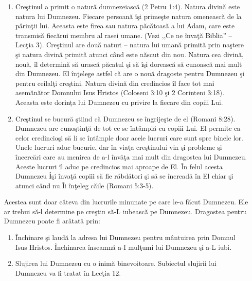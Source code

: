 \begin{enumerate}
\item Creştinul a primit o natură dumnezeiască (2 Petru 1:4). Natura divină este natura lui Dumnezeu. Fiecare persoană îşi primeşte natura omenească de la părinţii lui. Aceasta este firea sau natura păcătoasă a lui Adam, care este transmisă fiecărui membru al rasei umane. (Vezi ,,Ce ne învaţă Biblia'' – Lecţia 3). Creştinul are două naturi – natura lui umană primită prin naştere şi natura divină primită atunci când este născut din nou. Natura cea divină, nouă, îl determină să urască păcatul şi să îşi dorească să cunoască mai mult din Dumnezeu. El înţelege astfel că are o nouă dragoste pentru Dumnezeu şi pentru ceilalţi creştini. Natura divină din credincios îl face tot mai asemănător Domnului Isus Hristos (Coloseni 3:10 şi 2 Corinteni 3:18). Aceasta este dorința lui Dumnezeu cu privire la fiecare din copiii Lui.

\item Creştinul se bucură ştiind că Dumnezeu se îngrijeşte de el (Romani 8:28). Dumnezeu are cunoştinţă de tot ce se întâmplă cu copiii Lui. El permite ca celor credincioşi să li se întâmple doar acele lucruri care sunt spre binele lor. Unele lucruri aduc bucurie, dar în viaţa creştinului vin şi probleme şi încercări care au menirea de a-l învăţa mai mult din dragostea lui Dumnezeu. Aceste lucruri îl aduc pe credincios mai aproape de El. În felul acesta Dumnezeu Îşi învaţă copiii să fie răbdători şi să se încreadă în El chiar şi atunci când nu Îi înţeleg căile (Romani 5:3-5).

\end{enumerate}

Acestea sunt doar câteva din lucrurile minunate pe care le-a făcut Dumnezeu. Ele ar trebui să-l determine pe creştin să-L iubească pe Dumnezeu. Dragostea pentru Dumnezeu poate fi arătată prin:

\begin{enumerate}
	\item Închinare şi laudă la adresa lui Dumnezeu pentru mântuirea prin Domnul Isus Hristos. Închinarea înseamnă a-I mulţumi lui Dumnezeu şi a-L iubi.
	
	\item Slujirea lui Dumnezeu cu o inimă binevoitoare. Subiectul slujirii lui Dumnezeu va fi tratat în Lecţia 12.
	
\end{enumerate}

\vspace{2cm}

